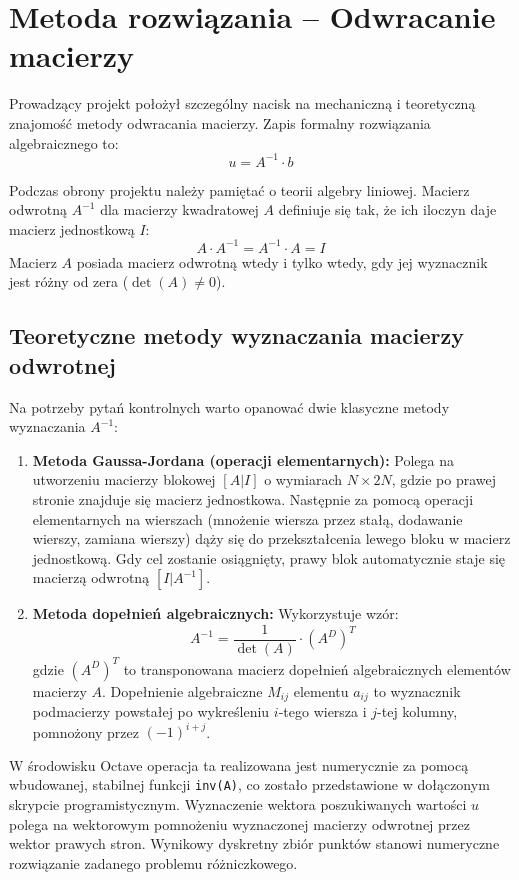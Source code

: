 \documentclass[a4paper,14pt]{scrartcl}
\begin{document}
\section{Metoda rozwiązania -- Odwracanie macierzy}
Prowadzący projekt położył szczególny nacisk na mechaniczną i teoretyczną znajomość metody odwracania macierzy. Zapis formalny rozwiązania algebraicznego to:
\begin{equation}
    u = A^{-1} \cdot b
\end{equation}

Podczas obrony projektu należy pamiętać o teorii algebry liniowej. Macierz odwrotną $A^{-1}$ dla macierzy kwadratowej $A$ definiuje się tak, że ich iloczyn daje macierz jednostkową $I$:
\begin{equation}
    A \cdot A^{-1} = A^{-1} \cdot A = I
\end{equation}
Macierz $A$ posiada macierz odwrotną wtedy i tylko wtedy, gdy jej wyznacznik jest różny od zera ($\det(A) \neq 0$).

\subsection{Teoretyczne metody wyznaczania macierzy odwrotnej}
Na potrzeby pytań kontrolnych warto opanować dwie klasyczne metody wyznaczania $A^{-1}$:
\begin{enumerate}
    \item \textbf{Metoda Gaussa-Jordana (operacji elementarnych):} Polega na utworzeniu macierzy blokowej $[A | I]$ o wymiarach $N \times 2N$, gdzie po prawej stronie znajduje się macierz jednostkowa. Następnie za pomocą operacji elementarnych na wierszach (mnożenie wiersza przez stałą, dodawanie wierszy, zamiana wierszy) dąży się do przekształcenia lewego bloku w macierz jednostkową. Gdy cel zostanie osiągnięty, prawy blok automatycznie staje się macierzą odwrotną $[I | A^{-1}]$.
    \item \textbf{Metoda dopełnień algebraicznych:} Wykorzystuje wzór:
          \begin{equation}
              A^{-1} = \frac{1}{\det(A)} \cdot (A^D)^T
          \end{equation}
          gdzie $(A^D)^T$ to transponowana macierz dopełnień algebraicznych elementów macierzy $A$. Dopełnienie algebraiczne $M_{ij}$ elementu $a_{ij}$ to wyznacznik podmacierzy powstałej po wykreśleniu $i$-tego wiersza i $j$-tej kolumny, pomnożony przez $(-1)^{i+j}$.
\end{enumerate}

W środowisku Octave operacja ta realizowana jest numerycznie za pomocą wbudowanej, stabilnej funkcji \texttt{inv(A)}, co zostało przedstawione w dołączonym skrypcie programistycznym. Wyznaczenie wektora poszukiwanych wartości $u$ polega na wektorowym pomnożeniu wyznaczonej macierzy odwrotnej przez wektor prawych stron. Wynikowy dyskretny zbiór punktów stanowi numeryczne rozwiązanie zadanego problemu różniczkowego.
\end{document}
